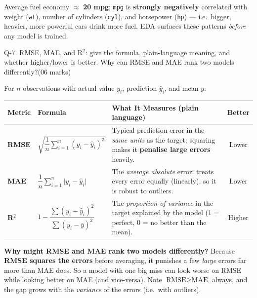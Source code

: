\documentclass[11pt,a4paper]{article}
\newcommand{\question}[3][05 marks]{%
  \begin{qbox}#2\hfill\textcolor{accent}{(#1)}\\[2pt]#3\end{qbox}%
}
\begin{document}
\begin{conceptbox}
Average fuel economy $\approx$ \textbf{20 mpg}; \texttt{mpg} is \textbf{strongly negatively} correlated with weight (\texttt{wt}), number of cylinders (\texttt{cyl}), and horsepower (\texttt{hp}) --- i.e.\ bigger, heavier, more powerful cars drink more fuel. EDA surfaces these patterns \emph{before} any model is trained.
\end{conceptbox}

\question[06 marks]{Q-7. RMSE, MAE, and R$^2$: give the formula, plain-language meaning, and whether higher/lower is better. Why can RMSE and MAE rank two models differently?}{}

For $n$ observations with actual value $y_i$, prediction $\hat{y}_i$, and mean $\bar{y}$:

\begin{center}
\begin{tabular}{@{}>{\bfseries}p{1.7cm}p{4.6cm}p{5.4cm}c@{}}
\toprule
\rowcolor{primary!15}
\textbf{Metric} & \textbf{Formula} & \textbf{What It Measures (plain language)} & \textbf{Better} \\
\midrule
RMSE &
$\sqrt{\dfrac{1}{n}\displaystyle\sum_{i=1}^{n}(y_i-\hat{y}_i)^2}$ &
Typical prediction error in the \emph{same units} as the target; squaring makes it \textbf{penalise large errors} heavily. &
\textcolor{accent}{Lower} \\
\addlinespace
MAE &
$\dfrac{1}{n}\displaystyle\sum_{i=1}^{n}\lvert y_i-\hat{y}_i\rvert$ &
The \emph{average absolute} error; treats every error equally (linearly), so it is robust to outliers. &
\textcolor{accent}{Lower} \\
\addlinespace
R$^2$ &
$1-\dfrac{\sum (y_i-\hat{y}_i)^2}{\sum (y_i-\bar{y})^2}$ &
The \emph{proportion of variance} in the target explained by the model (1 = perfect, 0 = no better than the mean). &
\textcolor{greenhl}{Higher} \\
\bottomrule
\end{tabular}
\end{center}

\textbf{Why might RMSE and MAE rank two models differently?} Because \textbf{RMSE squares the errors} before averaging, it punishes a few \emph{large} errors far more than MAE does. So a model with one big miss can look worse on RMSE while looking better on MAE (and vice-versa). Note $\text{RMSE} \ge \text{MAE}$ always, and the gap grows with the \emph{variance} of the errors (i.e.\ with outliers).
\end{document}
